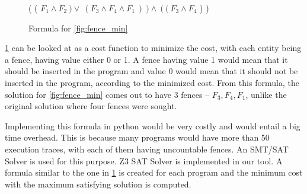 \begin{figure}
\begin{center}
	( ( $F_1 \land F_2\ ) \lor\ ( F_3 \land F_4 \land F_1\ )\ ) \land\ (\ (\ F_3 \land F_4$ ) )
	\caption{Formula for \ref{fig:fence_min}}
	\label{fig:fence_form}
\end{center}
\end{figure}

\par
\ref{fig:fence_form} can be looked at as a cost function to minimize the cost, with each entity being a fence, having value either 0 or 1. A fence having value 1 would mean that it should be inserted in the program and value 0 would mean that it should not be inserted in the program, according to the minimized cost. From this formula, the solution for \ref{fig:fence_min} comes out to have 3 fences – \textit{$F_3, F_4, F_1$}, unlike the original solution where four fences were sought.

\par
Implementing this formula in python would be very costly and would entail a big time overhead. This is because many programs would have more than 50 execution traces, with each of them having uncountable fences. An SMT/SAT Solver is used for this purpose. Z3 SAT Solver is implemented in our tool. A formula similar to the one in \ref{fig:fence_form} is created for each program and the minimum cost with the maximum satisfying solution is computed. 

